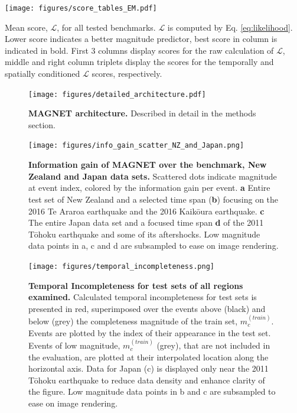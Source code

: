 \documentclass[pdflatex]{sn-jnl}
\begin{document}
\newpage
\begin{table}[h!]
    \centering
    \texttt{[image: figures/score\_tables\_EM.pdf]}
    \caption{Mean score, $\mathcal{L}$, for all tested benchmarks. $\mathcal{L}$ is computed by Eq. \ref{eq:likelihood}. Lower score indicates a better magnitude predictor, best score in column is indicated in bold. First 3 columns display scores for the raw calculation of $\mathcal{L}$, middle and right column triplets display the scores for the temporally and spatially conditioned $\mathcal{L}$ scores, respectively.
    }
    \label{tab:mean_ll_all_benchmarks}
\end{table}



\newpage
\begin{figure}[h!]
    \centering
    \texttt{[image: figures/detailed\_architecture.pdf]}
    \caption{\textbf{MAGNET architecture.} Described in detail in the methods section.}
    \label{fig:architecture}
\end{figure}

\newpage
\begin{figure}[h!]
	\centering
        \texttt{[image: figures/info\_gain\_scatter\_NZ\_and\_Japan.png]}
	\caption{
            \textbf{Information gain of MAGNET over the benchmark, New Zealand and Japan data sets.} Scattered dots indicate magnitude at event index, colored by the information gain per event. \textbf{a} Entire test set of New Zealand and a selected time span (\textbf{b}) focusing on the 2016 Te Araroa earthquake and the 2016 Kaikōura earthquake. \textbf{c} The entire Japan data set and a focused time span \textbf{d} of the 2011 Tōhoku earthquake and some of its aftershocks. Low magnitude data points in a, c and d are subsampled to ease on image rendering.
         }
\label{fig:nz_japan_info_gain}
\end{figure}

\newpage
\begin{figure}[h!]
    \centering
        \texttt{[image: figures/temporal\_incompleteness.png]}
    \caption{
    \textbf{Temporal Incompleteness for test sets of all regions examined.} Calculated temporal incompleteness for test sets is presented in red, superimposed over the events above (black) and below (grey) the completeness magnitude of the train set, $m_c^{(train)}$. Events are plotted by the index of their appearance in the test set. Events of low magnitude, $m_c^{(train)}$ (grey), that are not included in the evaluation, are plotted at their interpolated location along the horizontal axis. Data for Japan (c) is displayed only near the 2011 Tōhoku earthquake to reduce data density and enhance clarity of the figure. Low magnitude data points in b and c are subsampled to ease on image rendering.
    }
    \label{fig:temp_incompleteness}
\end{figure}
\end{document}
